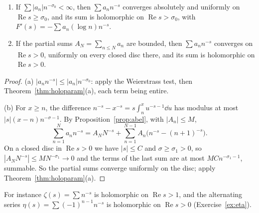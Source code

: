 \begin{proposition}\label{prop:dirseries}
\begin{enumerate}[label=(\alph*)]
\item If $\sum|a_n|n^{-\sigma_0}<\infty$, then $\sum a_nn^{-s}$ converges absolutely and uniformly on $\operatorname{Re}s\ge\sigma_0$, and its sum is holomorphic on
$\operatorname{Re}s>\sigma_0$, with $F'(s)=-\sum a_n(\log n)n^{-s}$.
\item If the partial sums $A_N=\sum_{n\le N}a_n$ are bounded, then $\sum a_nn^{-s}$ converges on $\operatorname{Re}s>0$, uniformly on every closed disc there,
and its sum is holomorphic on $\operatorname{Re}s>0$.
\end{enumerate}
\end{proposition}
\begin{proof}
(a) $|a_nn^{-s}|\le|a_n|n^{-\sigma_0}$: apply the Weierstrass test, then Theorem~\ref{thm:holoparam}(a), each term being entire.

(b) For $x\ge n$, the difference $n^{-s}-x^{-s}=s\int_n^xu^{-s-1}\dd u$ has modulus at most $|s|(x-n)n^{-\sigma-1}$. By Proposition~\ref{prop:abel}, with $|A_n|\le M$,
\[
\sum_{n=1}^Na_nn^{-s}=A_NN^{-s}+\sum_{n=1}^{N-1}A_n\bigl(n^{-s}-(n+1)^{-s}\bigr).
\]
On a closed disc in $\operatorname{Re}s>0$ we have $|s|\le C$ and $\sigma\ge\sigma_1>0$, so $|A_NN^{-s}|\le MN^{-\sigma_1}\to0$ and the terms of the last sum are at most
$MCn^{-\sigma_1-1}$, summable. So the partial sums converge uniformly on the disc; apply Theorem~\ref{thm:holoparam}(a).
\end{proof}

For instance $\zeta(s)=\sum n^{-s}$ is holomorphic on $\operatorname{Re}s>1$, and the alternating series $\eta(s)=\sum(-1)^{n-1}n^{-s}$ is holomorphic on
$\operatorname{Re}s>0$ (Exercise~\ref{ex:eta}).

